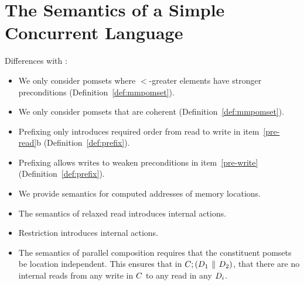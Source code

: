 \section{The Semantics of a Simple Concurrent Language}
\label{sec:model}

Differences with \cite{2019-sp}:
\begin{itemize}
\item We only consider pomsets where $\lt$-greater elements have stronger
  preconditions (Definition~\ref{def:mmpomset}).
\item We only consider pomsets that are coherent (Definition~\ref{def:mmpomset}).
\item Prefixing only introduces required order from read to write in item~\ref{pre-read}b (Definition~\ref{def:prefix}).
\item Prefixing allows writes to weaken preconditions in item~\ref{pre-write} (Definition~\ref{def:prefix}).
\item We provide semantics for computed addresses of memory locations.
\item The semantics of relaxed read introduces internal actions.
\item Restriction introduces internal actions.
\item The semantics of parallel composition requires that the constituent
  pomsets be location independent.  This ensures that in
  $C;(D_1\,\mathbin{\|}\,D_2)$, that there are no internal reads from any
  write in $C$ to any read in any $D_i$.
\end{itemize}








